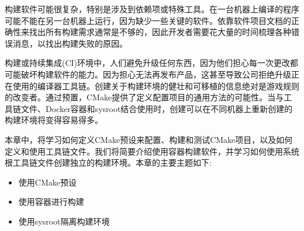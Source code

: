 构建软件可能很复杂，特别是涉及到依赖项或特殊工具。在一台机器上编译的程序可能不能在另一台机器上运行，因为缺少一些关键的软件。依靠软件项目文档的正确性来找出所有构建需求通常是不够的，因此开发者需要花大量的时间梳理各种错误消息，以找出构建失败的原因。

构建或持续集成(CI)环境中，人们避免升级任何东西，因为他们担心每一次更改都可能破坏构建软件的能力。因为担心无法再发布产品，这甚至导致公司拒绝升级正在使用的编译器工具链。创建关于构建环境的健壮和可移植的信息绝对是游戏规则的改变者。通过预置，CMake提供了定义配置项目的通用方法的可能性。当与工具链文件、Docker容器和sysroot结合使用时，创建可以在不同机器上重新创建的构建环境将变得容易得多。

本章中，将学习如何定义CMake预设来配置、构建和测试CMake项目，以及如何定义和使用工具链文件。我们将简要介绍使用容器构建软件，并学习如何使用系统根工具链文件创建独立的构建环境。本章的主要主题如下:

\begin{itemize}
\item 
使用CMake预设

\item 
使用容器进行构建

\item 
使用sysroot隔离构建环境
\end{itemize}






































